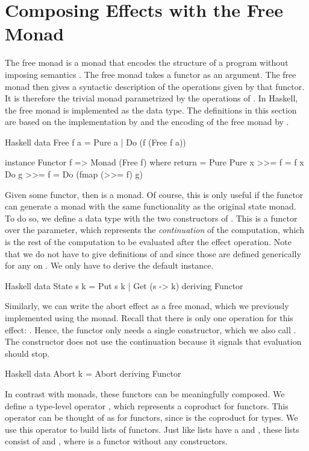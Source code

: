 \section{Composing Effects with the Free Monad}

The free monad is a monad that encodes the structure of a program without imposing semantics \autocite{swierstra_data_2008}. The free monad takes a functor  as an argument. The free monad then gives a syntactic description of the operations given by that functor. It is therefore the trivial monad parametrized by the operations of . In Haskell, the free monad is implemented as the  data type. The definitions in this section are based on the implementation by \textcite{kammar_handlers_2013} and the encoding of the free monad by \textcite{bach_poulsen_hefty_2023}.

\begin{lst}{Haskell}
data Free f a
  = Pure a
  | Do (f (Free f a))

instance Functor f => Monad (Free f) where
  return = Pure
  Pure x >>= f = f x
  Do g >>= f = Do (fmap (>>= f) g)
\end{lst}
%
Given some  functor, then  is a monad. Of course, this is only useful if the  functor can generate a monad with the same functionality as the original state monad. To do so, we define a data type with the two constructors of . This is a functor over the  parameter, which represents the \emph{continuation} of the computation, which is the rest of the computation to be evaluated after the effect operation. Note that we do not have to give definitions of  and \hs{>>=} since those are defined generically for any  on . We only have to derive the default  instance.

\begin{lst}{Haskell}
data State s k = Put s k | Get (s -> k)
  deriving Functor
\end{lst}
%
Similarly, we can write the abort effect as a free monad, which we previously implemented using the  monad. Recall that there is only one operation for this effect: . Hence, the  functor only needs a single constructor, which we also call . The  constructor does not use the continuation because it signals that evaluation should stop.

\begin{lst}{Haskell}
data Abort k = Abort
  deriving Functor
\end{lst}
%
In contrast with monads, these functors can be meaningfully composed. We define a type-level operator \hs{+}, which represents a coproduct for functors. This operator can be thought of as  for functors, since  is the coproduct for types. We use this operator to build lists of functors. Just like lists have a  and , these lists consist of \hs{+} and , where  is a functor without any constructors.

